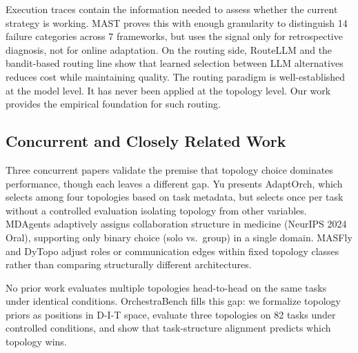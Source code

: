 Execution traces contain the information needed to assess whether the current strategy is working. MAST \cite{cemri_2025} proves this with enough granularity to distinguish 14 failure categories across 7 frameworks, but uses the signal only for retrospective diagnosis, not for online adaptation. On the routing side, RouteLLM \cite{routellm_2025} and the bandit-based routing line \cite{bandit_route_2025, neural_bandit_2025} show that learned selection between LLM alternatives reduces cost while maintaining quality. The routing paradigm is well-established at the model level. It has never been applied at the topology level. Our work provides the empirical foundation for such routing.

\subsection{Concurrent and Closely Related Work}\label{concurrent-work}

Three concurrent papers validate the premise that topology choice dominates performance, though each leaves a different gap. Yu \cite{yu_2026} presents AdaptOrch, which selects among four topologies based on task metadata, but selects once per task without a controlled evaluation isolating topology from other variables. MDAgents \cite{kim_2024} adaptively assigns collaboration structure in medicine (NeurIPS 2024 Oral), supporting only binary choice (solo vs.\ group) in a single domain. MASFly \cite{masfly_2026} and DyTopo \cite{lu_2026} adjust roles or communication edges within fixed topology classes rather than comparing structurally different architectures.

No prior work evaluates multiple topologies head-to-head on the same tasks under identical conditions. OrchestraBench fills this gap: we formalize topology priors as positions in D-I-T space, evaluate three topologies on 82 tasks under controlled conditions, and show that task-structure alignment predicts which topology wins.
